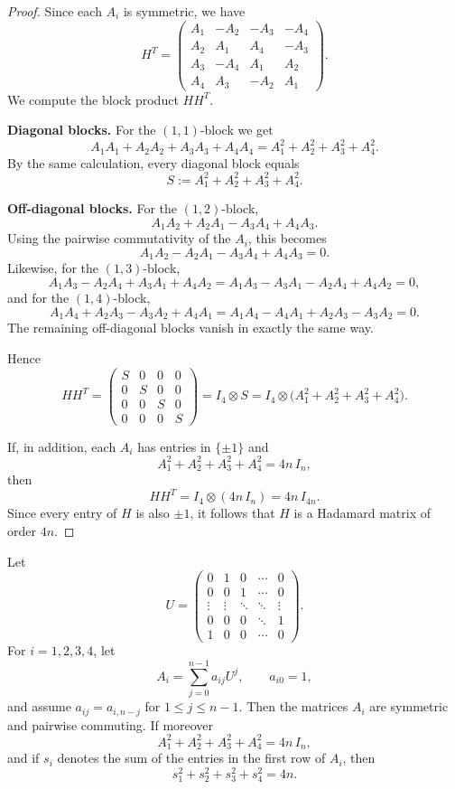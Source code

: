 \documentclass[11pt, a4paper]{ctexrep}
\begin{document}
\begin{proof}
    Since each $A_i$ is symmetric, we have
    \[
    H^T=
    \begin{pmatrix}
    A_1 & -A_2 & -A_3 & -A_4\\
    A_2 & A_1 & A_4 & -A_3\\
    A_3 & -A_4 & A_1 & A_2\\
    A_4 & A_3 & -A_2 & A_1
    \end{pmatrix}.
    \]
    We compute the block product $HH^T$.
    
    \medskip
    \noindent\textbf{Diagonal blocks.}
    For the $(1,1)$-block we get
    \[
    A_1A_1+A_2A_2+A_3A_3+A_4A_4
    =
    A_1^2+A_2^2+A_3^2+A_4^2.
    \]
    By the same calculation, every diagonal block equals
    \[
    S:=A_1^2+A_2^2+A_3^2+A_4^2.
    \]
    
    \medskip
    \noindent\textbf{Off-diagonal blocks.}
    For the $(1,2)$-block,
    \[
    A_1A_2+A_2A_1-A_3A_4+A_4A_3.
    \]
    Using the pairwise commutativity of the $A_i$, this becomes
    \[
    A_1A_2-A_2A_1-A_3A_4+A_4A_3=0.
    \]
    Likewise, for the $(1,3)$-block,
    \[
    A_1A_3-A_2A_4+A_3A_1+A_4A_2
    =
    A_1A_3-A_3A_1-A_2A_4+A_4A_2=0,
    \]
    and for the $(1,4)$-block,
    \[
    A_1A_4+A_2A_3-A_3A_2+A_4A_1
    =
    A_1A_4-A_4A_1+A_2A_3-A_3A_2=0.
    \]
    The remaining off-diagonal blocks vanish in exactly the same way.
    
    Hence
    \[
    HH^T=
    \begin{pmatrix}
    S & 0 & 0 & 0\\
    0 & S & 0 & 0\\
    0 & 0 & S & 0\\
    0 & 0 & 0 & S
    \end{pmatrix}
    =
    I_4\otimes S
    =
    I_4\otimes\bigl(A_1^2+A_2^2+A_3^2+A_4^2\bigr).
    \]
    
    If, in addition, each $A_i$ has entries in $\{\pm1\}$ and
    \[
    A_1^2+A_2^2+A_3^2+A_4^2=4n\,I_n,
    \]
    then
    \[
    HH^T
    =
    I_4\otimes (4n\,I_n)
    =
    4n\,I_{4n}.
    \]
    Since every entry of $H$ is also $\pm1$, it follows that $H$ is a Hadamard matrix of order $4n$.
    \end{proof}
    
    \begin{proposition}
    Let
    \[
    U=
    \begin{pmatrix}
    0&1&0&\cdots&0\\
    0&0&1&\cdots&0\\
    \vdots&\vdots&\ddots&\ddots&\vdots\\
    0&0&0&\ddots&1\\
    1&0&0&\cdots&0
    \end{pmatrix}.
    \]
    For $i=1,2,3,4$, let
    \[
    A_i=\sum_{j=0}^{n-1} a_{ij}U^j,
    \qquad a_{i0}=1,
    \]
    and assume $a_{ij}=a_{i,n-j}$ for $1\le j\le n-1$.
    Then the matrices $A_i$ are symmetric and pairwise commuting. If moreover
    \[
    A_1^2+A_2^2+A_3^2+A_4^2=4n\,I_n,
    \]
    and if $s_i$ denotes the sum of the entries in the first row of $A_i$, then
    \[
    s_1^2+s_2^2+s_3^2+s_4^2=4n.
    \]
    \end{proposition}
    
\end{document}
